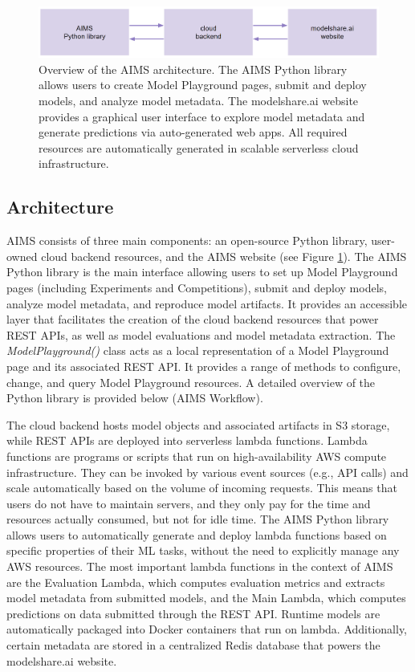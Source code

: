 \begin{figure}
  \centering
  \includegraphics[width=1\textwidth]{figures/fig_aims_architecture.png}
  \caption{Overview of the AIMS architecture. The AIMS Python library allows users to create Model Playground pages, submit and deploy models, and analyze model metadata. The modelshare.ai website provides a graphical user interface to explore model metadata and generate predictions via auto-generated web apps. All required resources are automatically generated in scalable serverless cloud infrastructure.}
  \label{fig:fig_architecture}
\end{figure}

\subsection{Architecture}
AIMS consists of three main components: an open-source Python library, user-owned cloud backend resources, and the AIMS website (see Figure \ref{fig:fig_architecture}). The AIMS Python library is the main interface allowing users to set up Model Playground pages (including Experiments and Competitions), submit and deploy models, analyze model metadata, and reproduce model artifacts. It provides an accessible layer that facilitates the creation of the cloud backend resources that power REST APIs, as well as model evaluations and model metadata extraction. The \textit{ModelPlayground()} class acts as a local representation of a Model Playground page and its associated REST API. It provides a range of methods to configure, change, and query Model Playground resources. A detailed overview of the Python library is provided below (AIMS Workflow).

The cloud backend hosts model objects and associated artifacts in S3 storage, while REST APIs are deployed into serverless lambda functions. Lambda functions are programs or scripts that run on high-availability AWS compute infrastructure. They can be invoked by various event sources (e.g., API calls) and scale automatically based on the volume of incoming requests. This means that users do not have to maintain servers, and they only pay for the time and resources actually consumed, but not for idle time. The AIMS Python library allows users to automatically generate and deploy lambda functions based on specific properties of their ML tasks, without the need to explicitly manage any AWS resources. The most important lambda functions in the context of AIMS are the Evaluation Lambda, which computes evaluation metrics and extracts model metadata from submitted models, and the Main Lambda, which computes predictions on data submitted through the REST API. Runtime models are automatically packaged into Docker containers that run on lambda. Additionally, certain metadata are stored in a centralized Redis database that powers the modelshare.ai website.

